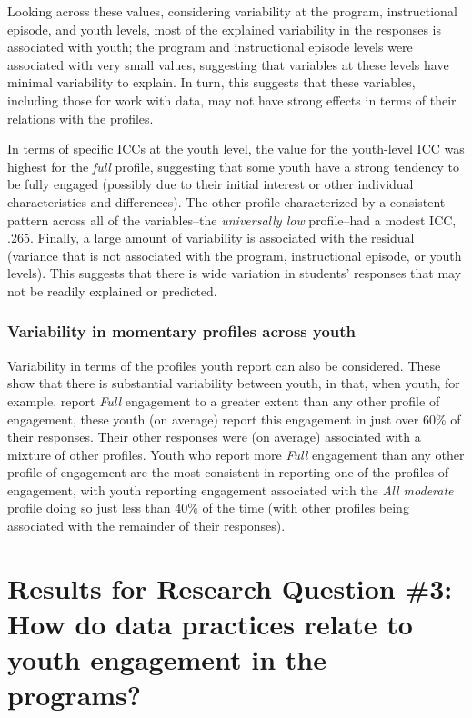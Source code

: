 \documentclass[]{book}
\theoremstyle{definition}
\theoremstyle{definition}
\theoremstyle{definition}
\theoremstyle{remark}
\begin{document}
Looking across these values, considering variability at the program,
instructional episode, and youth levels, most of the explained
variability in the responses is associated with youth; the program and
instructional episode levels were associated with very small values,
suggesting that variables at these levels have minimal variability to
explain. In turn, this suggests that these variables, including those
for work with data, may not have strong effects in terms of their
relations with the profiles.

In terms of specific ICCs at the youth level, the value for the
youth-level ICC was highest for the \emph{full} profile, suggesting that
some youth have a strong tendency to be fully engaged (possibly due to
their initial interest or other individual characteristics and
differences). The other profile characterized by a consistent pattern
across all of the variables--the \emph{universally low} profile--had a
modest ICC, .265. Finally, a large amount of variability is associated
with the residual (variance that is not associated with the program,
instructional episode, or youth levels). This suggests that there is
wide variation in students' responses that may not be readily explained
or predicted.

\subsubsection{Variability in momentary profiles across
youth}\label{variability-in-momentary-profiles-across-youth}

Variability in terms of the profiles youth report can also be
considered. These show that there is substantial variability between
youth, in that, when youth, for example, report \emph{Full} engagement
to a greater extent than any other profile of engagement, these youth
(on average) report this engagement in just over 60\% of their
responses. Their other responses were (on average) associated with a
mixture of other profiles. Youth who report more \emph{Full} engagement
than any other profile of engagement are the most consistent in
reporting one of the profiles of engagement, with youth reporting
engagement associated with the \emph{All moderate} profile doing so just
less than 40\% of the time (with other profiles being associated with
the remainder of their responses).

\section{Results for Research Question \#3: How do data practices relate
to youth engagement in the
programs?}\label{results-for-research-question-3-how-do-data-practices-relate-to-youth-engagement-in-the-programs}
\end{document}
